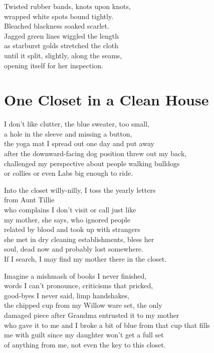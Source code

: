 \documentclass[twoside,10pt]{book}
\begin{document}
Twisted rubber bands, knots upon knots,\\
wrapped white spots bound tightly.\\
Bleached blackness soaked scarlet.\\
Jagged green lines wiggled the length\\
as starburst golds stretched the cloth\\
until it split, slightly, along the seams,\\
opening itself for her inspection.


\clearpage
\section{One Closet in a Clean House}

I don't like clutter, the blue sweater, too small,\\
a hole in the sleeve and missing a button,\\
the yoga mat I spread out one day and put away\\
after the downward-facing dog position threw out my back,\\
challenged my perspective about people walking bulldogs\\
or collies or even Labs big enough to ride.

Into the closet willy-nilly, I toss the yearly letters\\
from Aunt Tillie\\
who complains I don't visit or call just like\\
my mother, she says, who ignored people\\
related by blood and took up with strangers\\
she met in dry cleaning establishments, bless her\\
soul, dead now and probably lost somewhere.\\
If I search, I may find my mother there in the closet.

Imagine a mishmash of books I never finished,\\
words I can't pronounce, criticisms that pricked,\\
good-byes I never said, limp handshakes,\\
the chipped cup from my Willow ware set, the only\\
damaged piece after Grandma entrusted it to my mother\\
who gave it to me and I broke a bit of blue from that cup that fills\\
me with guilt since my daughter won't get a full set\\
of anything from me, not even the key to this closet.
\end{document}
